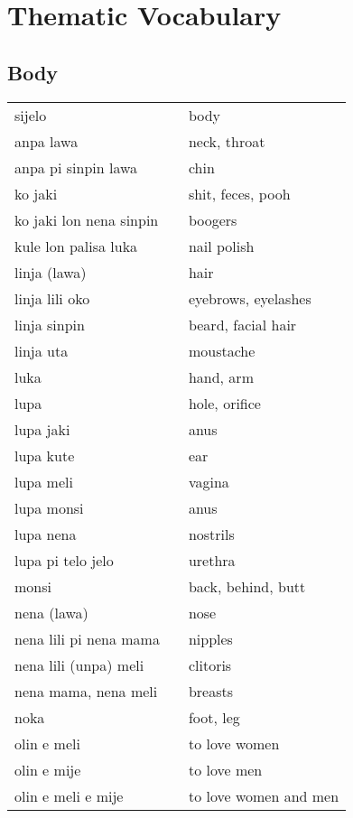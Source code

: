 \section{Thematic Vocabulary}
\label{'thematic_vocabulary'}
%
%
%
%
\subsection{Body}
%
\begin{supertabular}{p{4,5cm}|ll}
sijelo && body \\
anpa lawa && neck, throat \\
anpa pi sinpin lawa && chin \\
ko jaki && shit, feces, pooh \\
ko jaki lon nena sinpin && boogers \\
kule lon palisa luka && nail polish \\
linja (lawa) && hair \\
linja lili oko && eyebrows, eyelashes \\
linja sinpin && beard, facial hair \\
linja uta && moustache \\
luka && hand, arm \\
lupa && hole, orifice \\
lupa jaki && anus \\
lupa kute && ear \\
lupa meli && vagina \\
lupa monsi && anus \\
lupa nena && nostrils \\
lupa pi telo jelo && urethra \\
monsi && back, behind, butt \\
nena (lawa) && nose \\
nena lili pi nena mama && nipples \\
nena lili (unpa) meli && clitoris \\
nena mama, nena meli  && breasts \\
noka && foot, leg \\
olin e meli && to love women \\
olin e mije && to love men \\
olin e meli e mije && to love women and men \\

\end{supertabular}
